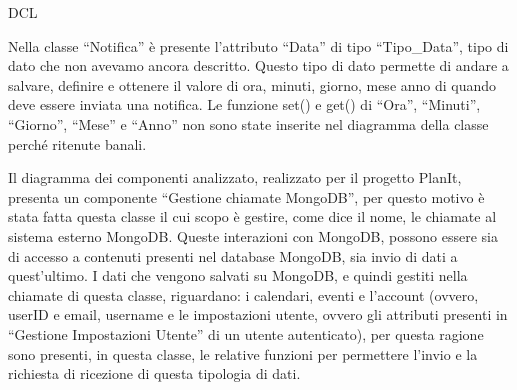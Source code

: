 \begin{listaPersonale}{DCL}
    
        \begin{center}
            
        \end{center}
    
        


    Nella classe “Notifica” è presente l'attributo “Data” di tipo “Tipo\_Data”, tipo di dato che non avevamo ancora descritto. Questo tipo di dato permette di andare a salvare, definire e ottenere il valore di ora, minuti, giorno, mese anno di quando deve essere inviata una notifica. Le funzione set() e get() di “Ora”, “Minuti”, “Giorno”, “Mese” e “Anno” non sono state inserite nel diagramma della classe perché ritenute banali.
    
    
        \begin{center}
            
        \end{center}
    
        

    Il diagramma dei componenti analizzato, realizzato per il progetto PlanIt, presenta un componente “Gestione chiamate MongoDB”, per questo motivo è stata fatta questa classe il cui scopo è gestire, come dice il nome, le chiamate al sistema esterno MongoDB. Queste interazioni con MongoDB, possono essere sia di accesso a contenuti presenti nel database MongoDB, sia invio di dati a quest'ultimo. I dati che vengono salvati su MongoDB, e quindi gestiti nella chiamate di questa classe, riguardano: i calendari, eventi e l'account (ovvero, userID e email, username e le impostazioni utente, ovvero gli attributi presenti in “Gestione Impostazioni Utente” di un utente autenticato), per questa ragione sono presenti, in questa classe, le relative funzioni per permettere l'invio e la richiesta di ricezione di questa tipologia di dati.
    
    
        \begin{center}
            
        \end{center}
    

\end{listaPersonale}
